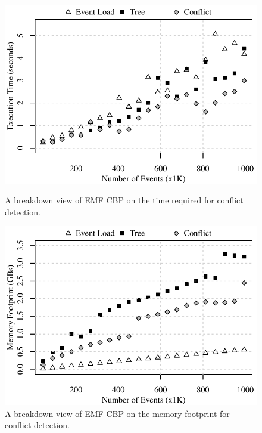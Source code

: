 \begin{figure}[]
\centering
\begin{minipage}[b]{0.490\textwidth}
	\includegraphics[width=\linewidth]{ecbp-conflict-time-events}
	\caption{A breakdown view of EMF CBP on the time required for conflict detection.}
	\label{fig:ecbp-conflict-time-events}    
\end{minipage}
\hfill
\begin{minipage}[b]{0.490\textwidth}
	\includegraphics[width=\linewidth]{ecbp-conflict-memory-events}
	\caption{A breakdown view of EMF CBP on the memory footprint for conflict detection.}
	\label{fig:ecbp-conflict-memory-events}    
\end{minipage}  
\end{figure}

